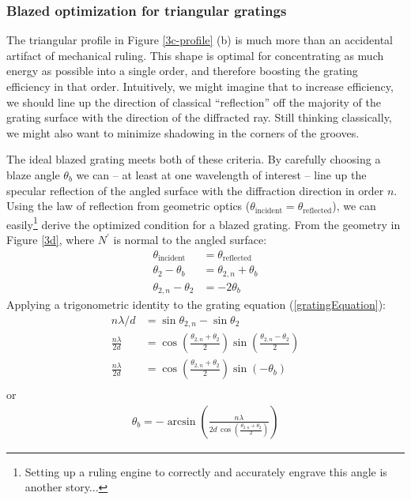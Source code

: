 \subsubsection{Blazed optimization for triangular gratings}
\label{blazeAngle}
The triangular profile in Figure \ref{3c-profile} (b) is much more than an accidental artifact of mechanical ruling.  This shape is optimal for concentrating as much energy as possible into a single order, and therefore boosting the grating efficiency in that order.  Intuitively, we might imagine that to increase efficiency, we should line up the direction of classical ``reflection'' off the majority of the grating surface with the direction of the diffracted ray.  Still thinking classically, we might also want to minimize shadowing in the corners of the grooves. 

The ideal blazed grating meets both of these criteria.  By carefully choosing a blaze angle $\theta_b$ we can -- at least at one wavelength of interest -- line up the specular reflection of the angled surface with the diffraction direction in order $n$.  Using the law of reflection from geometric optics ($\theta_{\mathrm{incident}} = \theta_{\mathrm{reflected}}$), we can easily\footnote{Setting up a ruling engine to correctly and accurately engrave this angle is another story...} derive the optimized condition for a blazed grating.  From the geometry in Figure \ref{3d}, where $N^\prime$ is normal to the angled surface: 
\begin{align}
\theta_{\mathrm{incident}} &= \theta_{\mathrm{reflected}} \\
\theta_2 - \theta_b &= \theta_{2,n} + \theta_b \\
\theta_{2,n} - \theta_{2} &= -2 \theta_b
\end{align}
Applying a trigonometric identity to the grating equation (\ref{gratingEquation}):
\begin{align}
n\lambda / d &= \sin\theta_{2,n} - \sin\theta_{2} \\
\frac{n\lambda}{2d} &= \cos \left( \frac{\theta_{2,n} + \theta_{2}}{2} \right) \sin \left( \frac{\theta_{2,n} - \theta_{2}}{2} \right) \\
\frac{n\lambda}{2d} &= \cos \left( \frac{\theta_{2,n} + \theta_{2}}{2} \right) \sin \left( -\theta_b \right) \\
\end{align}
or
\begin{align}
\label{blazeAngleEqn}
\theta_b = -\arcsin \left(   \frac{n \lambda}{2d \, \cos \left( \frac{\theta_{2,n} + \theta_{2}}{2} \right)}     \right)
\end{align}

